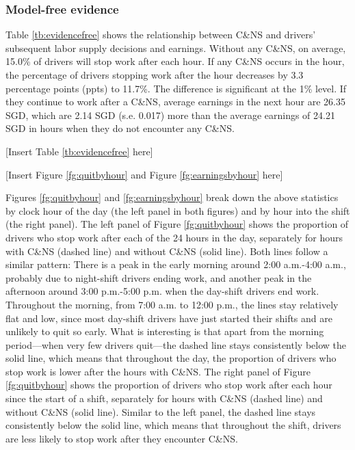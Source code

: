 \documentclass[reviewmode]{restat}
\begin{document}
\subsubsection{Model-free evidence}
Table \ref{tb:evidencefree} shows the relationship between C\&NS and drivers' subsequent labor supply 
decisions and earnings. %
Without any C\&NS, on average, 15.0\% of drivers will stop work after each hour.
If any C\&NS occurs in the hour, the percentage of drivers stopping work after the hour decreases by 3.3
percentage points (ppts) to 11.7\%. The difference is significant at the 1\% level. If they continue to 
work after a C\&NS, average earnings in the next hour are 26.35 SGD, which are 2.14 SGD
(s.e. 0.017) more than the average earnings of 24.21 SGD in hours when they do not encounter any C\&NS. 

\begin{center}
	[Insert Table \ref{tb:evidencefree} here]
\end{center}

\begin{center}
	[Insert Figure \ref{fg:quitbyhour} and Figure \ref{fg:earningsbyhour} here]
\end{center}


Figures \ref{fg:quitbyhour} and \ref{fg:earningsbyhour} break down the above statistics by clock hour 
of the day (the left panel in both figures) and by hour into the shift (the right panel). 
The left panel of Figure \ref{fg:quitbyhour} shows the proportion of drivers who stop work after each
of the 24 hours in the day, separately for hours with C\&NS (dashed line) and without C\&NS (solid line).
Both lines follow a similar pattern: There is a peak in the early morning around 2:00 a.m.-4:00 a.m., 
probably due to night-shift drivers ending work, and another peak in the afternoon around 3:00 p.m.-5:00 p.m.
when the day-shift drivers end work. Throughout the morning, from 7:00 a.m. to 12:00 p.m., the lines stay
relatively flat and low, since most day-shift drivers have just started their shifts and are unlikely to 
quit so early. What is interesting is that apart from the morning period---when very few drivers quit---the 
dashed line stays consistently below the solid line, which means that throughout  the day, the proportion
of drivers who stop work is lower after the hours with C\&NS. The right panel of Figure \ref{fg:quitbyhour}
shows the proportion of drivers who stop work after each hour since the start of a shift, separately for
hours with C\&NS (dashed line) and without C\&NS (solid line). Similar to the left panel, the dashed line
stays consistently below the solid line, which means that throughout the shift, drivers are less likely to
stop work after they encounter C\&NS.
\end{document}
